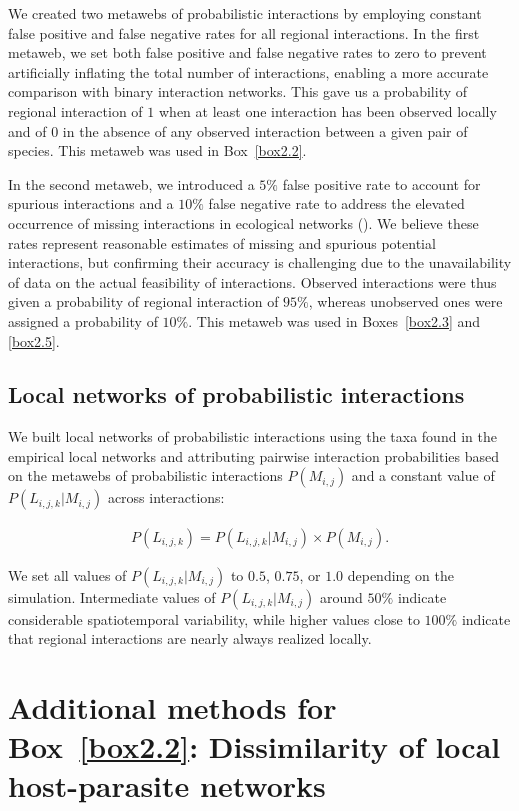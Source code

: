 \begin{refsection}
We created two metawebs of probabilistic interactions by employing constant
false positive and false negative rates for all regional interactions. In the
first metaweb, we set both false positive and false negative rates to zero to
prevent artificially inflating the total number of interactions, enabling a more
accurate comparison with binary interaction networks. This gave us a probability
of regional interaction of $1$ when at least one interaction has been observed
locally and of $0$ in the absence of any observed interaction between a given
pair of species. This metaweb was used in Box~\ref{box2.2}. 

In the second metaweb, we introduced a $5\%$ false positive rate to account for
spurious interactions and a $10\%$ false negative rate to address the elevated
occurrence of missing interactions in ecological networks
(\cite{Catchen2023Missinga}). We believe these rates represent reasonable
estimates of missing and spurious potential interactions, but confirming their
accuracy is challenging due to the unavailability of data on the actual
feasibility of interactions. Observed interactions were thus given a probability
of regional interaction of $95\%$, whereas unobserved ones were assigned a
probability of $10\%$. This metaweb was used in Boxes~\ref{box2.3} and
\ref{box2.5}.

\subsection{Local networks of probabilistic interactions}

We built local networks of probabilistic interactions using the taxa found in
the empirical local networks and attributing pairwise interaction probabilities
based on the metawebs of probabilistic interactions $P(M_{i, j})$ and a constant
value of $P(L_{i, j, k}|M_{i, j})$ across interactions:

\begin{eqnarray}
    \label{eq:local_meta_sup}
    P(L_{i, j, k}) = P(L_{i, j, k} | M_{i, j})
    \times P(M_{i, j}).
\end{eqnarray}

We set all values of $P(L_{i, j, k}|M_{i, j})$ to $0.5$, $0.75$, or $1.0$
depending on the simulation. Intermediate values of $P(L_{i, j, k}|M_{i, j})$
around $50\%$ indicate considerable spatiotemporal variability, while higher
values close to $100\%$ indicate that regional interactions are nearly always
realized locally. 

\section{Additional methods for Box~\ref{box2.2}: Dissimilarity of local host-parasite networks}


\end{refsection}
